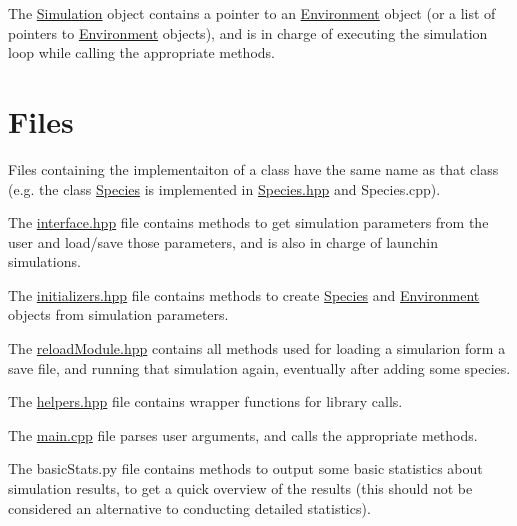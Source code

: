 The \hyperlink{classSimulation}{Simulation} object contains a pointer to an \hyperlink{classEnvironment}{Environment} object (or a list of pointers to \hyperlink{classEnvironment}{Environment} objects), and is in charge of executing the simulation loop while calling the appropriate methods.\hypertarget{index_doc_files}{}\section{Files}\label{index_doc_files}
Files containing the implementaiton of a class have the same name as that class (e.\+g. the class \hyperlink{classSpecies}{Species} is implemented in \hyperlink{Species_8hpp}{Species.\+hpp} and Species.\+cpp).

The \hyperlink{interface_8hpp}{interface.\+hpp} file contains methods to get simulation parameters from the user and load/save those parameters, and is also in charge of launchin simulations.

The \hyperlink{initializers_8hpp}{initializers.\+hpp} file contains methods to create \hyperlink{classSpecies}{Species} and \hyperlink{classEnvironment}{Environment} objects from simulation parameters.

The \hyperlink{reloadModule_8hpp}{reload\+Module.\+hpp} contains all methods used for loading a simularion form a save file, and running that simulation again, eventually after adding some species.

The \hyperlink{helpers_8hpp}{helpers.\+hpp} file contains wrapper functions for library calls.

The \hyperlink{main_8cpp}{main.\+cpp} file parses user arguments, and calls the appropriate methods.

The basic\+Stats.\+py file contains methods to output some basic statistics about simulation results, to get a quick overview of the results (this should not be considered an alternative to conducting detailed statistics). 